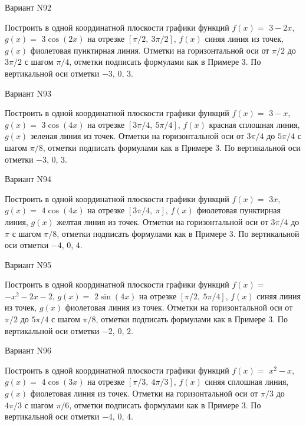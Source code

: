 \documentclass[11pt]{report}
\begin{document}
Вариант N92

Построить в одной координатной плоскости графики функций $f(x) = $
    $3 - 2 x$, $g(x) = $
    $3 \cos{\left(2 x \right)}$ на 
    отрезке $\left[ \pi / 2, \  3 \pi / 2\right]$, $f(x)$ синяя 
    линия из точек, $g(x)$ фиолетовая пунктирная линия. 
    Отметки на горизонтальной оси от $\pi / 2$ до $3 \pi / 2$ с 
    шагом $\pi / 4$, отметки подписать формулами как в Примере 3.  
    По вертикальной оси отметки $-3$, 0, $3$.

Вариант N93

Построить в одной координатной плоскости графики функций $f(x) = $
    $3 - x$, $g(x) = $
    $3 \cos{\left(4 x \right)}$ на 
    отрезке $\left[ 3 \pi / 4, \  5 \pi / 4\right]$, $f(x)$ красная 
    сплошная линия, $g(x)$ зеленая линия из точек. 
    Отметки на горизонтальной оси от $3 \pi / 4$ до $5 \pi / 4$ с 
    шагом $\pi / 8$, отметки подписать формулами как в Примере 3.  
    По вертикальной оси отметки $-3$, 0, $3$.

Вариант N94

Построить в одной координатной плоскости графики функций $f(x) = $
    $3 x$, $g(x) = $
    $4 \cos{\left(4 x \right)}$ на 
    отрезке $\left[ 3 \pi / 4, \  \pi\right]$, $f(x)$ фиолетовая 
    пунктирная линия, $g(x)$ желтая линия из точек. 
    Отметки на горизонтальной оси от $3 \pi / 4$ до $\pi$ с 
    шагом $\pi / 8$, отметки подписать формулами как в Примере 3.  
    По вертикальной оси отметки $-4$, 0, $4$.

Вариант N95

Построить в одной координатной плоскости графики функций $f(x) = $
    $- x^{2} - 2 x - 2$, $g(x) = $
    $2 \sin{\left(4 x \right)}$ на 
    отрезке $\left[ \pi / 2, \  5 \pi / 4\right]$, $f(x)$ синяя 
    линия из точек, $g(x)$ фиолетовая линия из точек. 
    Отметки на горизонтальной оси от $\pi / 2$ до $5 \pi / 4$ с 
    шагом $\pi / 8$, отметки подписать формулами как в Примере 3.  
    По вертикальной оси отметки $-2$, 0, $2$.

Вариант N96

Построить в одной координатной плоскости графики функций $f(x) = $
    $x^{2} - x$, $g(x) = $
    $4 \cos{\left(3 x \right)}$ на 
    отрезке $\left[ \pi / 3, \  4 \pi / 3\right]$, $f(x)$ синяя 
    сплошная линия, $g(x)$ фиолетовая линия из точек. 
    Отметки на горизонтальной оси от $\pi / 3$ до $4 \pi / 3$ с 
    шагом $\pi / 6$, отметки подписать формулами как в Примере 3.  
    По вертикальной оси отметки $-4$, 0, $4$.
\end{document}
